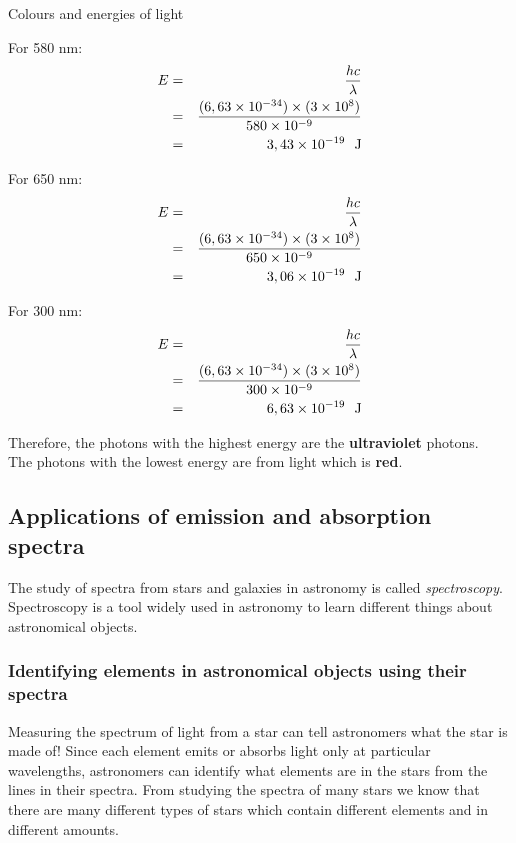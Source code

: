 \begin{wex}{Colours and energies of light}
{\begin{minipage}{0.3\textwidth}
For 580 nm:
\begin{eqnarray*}
E & = & \frac{hc}{\lambda} \\
  & = & \frac{(6,63 \times 10^{-34}) \times (3 \times 10^{8}) }{580 \times 10^{-9}} \\
  & = &  3,43 \times 10^{-19}~~\rm{J}
\end{eqnarray*}
\end{minipage}

\begin{minipage}{0.3\textwidth}
For 650 nm:
\begin{eqnarray*}
E & = & \frac{hc}{\lambda} \\
  & = & \frac{(6,63 \times 10^{-34}) \times (3 \times 10^{8}) }{650 \times 10^{-9}} \\
  & = &  3,06 \times 10^{-19}~~\rm{J}
\end{eqnarray*}
\end{minipage}

\begin{minipage}{0.3\textwidth}
For 300 nm:
\begin{eqnarray*}
E & = & \frac{hc}{\lambda} \\
  & = & \frac{(6,63 \times 10^{-34}) \times (3 \times 10^{8}) }{300 \times 10^{-9}} \\
  & = &  6,63 \times 10^{-19}~~\rm{J}
\end{eqnarray*}
\end{minipage}

Therefore, the photons with the highest energy are the \textbf{ultraviolet} photons. \\
The photons with the lowest energy are from light which is \textbf{red}.

}
\end{wex}



\subsection{Applications of emission and absorption spectra}
The study of spectra from stars and galaxies in astronomy is called \textit{spectroscopy}. Spectroscopy is a tool widely used in astronomy to learn different things about astronomical objects.

\subsubsection{Identifying elements in astronomical objects using their spectra}
Measuring the spectrum of light from a star can tell astronomers what the star is made of! Since each element emits or absorbs light only at particular wavelengths, astronomers can identify what elements are in the stars from the lines in their spectra. From studying the spectra of many stars we know that there are many different types of stars which contain different elements and in different amounts.

